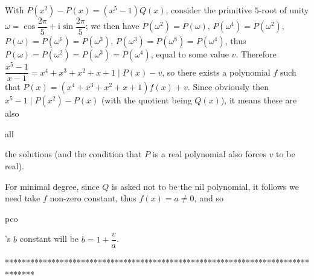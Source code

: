 \begin{solution}
	With $P(x^2)-P(x) = (x^5-1)Q(x)$, consider the primitive $5$-root of unity $\omega = \cos \dfrac {2\pi}{5} + \textrm{i}\sin \dfrac {2\pi}{5}$; we then have $P(\omega^2)=P(\omega)$, $P(\omega^4)=P(\omega^2)$, $P(\omega)=P(\omega^6) = P(\omega^3)$, $P(\omega^3)=P(\omega^8) = P(\omega^4)$, thus $P(\omega)=P(\omega^2) = P(\omega^3)=P(\omega^4)$, equal to some value $v$. Therefore $\dfrac {x^5-1}{x-1} = x^4+x^3+x^2+x+1 \mid P(x) - v$, so there exists a polynomial $f$ such that $P(x) = (x^4+x^3+x^2+x+1)f(x) + v$. Since obviously then $x^5-1 \mid P(x^2)-P(x)$ (with the quotient being $Q(x)$), it means these are also \begin{bolded}all\end{bolded} the solutions (and the condition that $P$ is a real polynomial also forces $v$ to be real).

For minimal degree, since $Q$ is asked not to be the nil polynomial, it follows we need take $f$ non-zero constant, thus $f(x)=a\neq 0$, and so \begin{bolded}pco\end{bolded}'s $b$ constant will be $b=1+\dfrac {v}{a}$.
\end{solution}
*******************************************************************************
